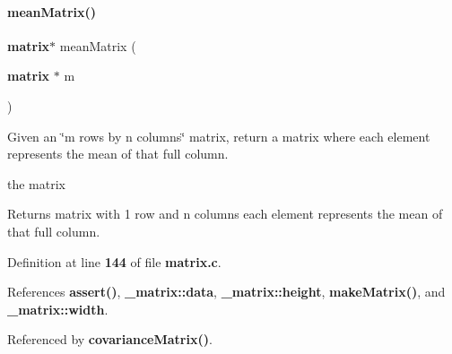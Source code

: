 \mbox{\label{matrix_8h_ae4babf9b518a2d5d6b12776191e3b7de}} 
\paragraph{mean\+Matrix()}
{\footnotesize\ttfamily \textbf{ matrix}$\ast$ mean\+Matrix (\begin{DoxyParamCaption}\item[{\textbf{ matrix} $\ast$}]{m }\end{DoxyParamCaption})}



Given an \char`\"{}m rows by n columns\char`\"{} matrix, return a matrix where each element represents the mean of that full column. 

the matrix \begin{DoxyReturn}{Returns}
matrix with 1 row and n columns each element represents the mean of that full column. 
\end{DoxyReturn}


Definition at line \textbf{ 144} of file \textbf{ matrix.\+c}.



References \textbf{ assert()}, \textbf{ \+\_\+matrix\+::data}, \textbf{ \+\_\+matrix\+::height}, \textbf{ make\+Matrix()}, and \textbf{ \+\_\+matrix\+::width}.



Referenced by \textbf{ covariance\+Matrix()}.


